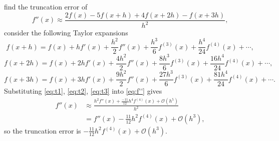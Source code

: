\documentclass[a4paper,11pt]{article}
\begin{document}
\begin{enumerate}
\begin{enumerate}
		find the truncation error of 
		\begin{equation}
			f''(x) \approx \frac{2f(x)-5f(x+h)+4f(x+2h)-f(x+3h)}{h^{2}},
			\label{eq:f''}
		\end{equation}
		consider the following Taylor expansions
		\begin{equation}
			f(x + h) = f(x) + hf'(x) + \frac{h^{2}}{2}f''(x) + 
			\frac{h^{3}}{6}f^{(3)}(x) + \frac{h^{4}}{24}f^{(4)}(x) + \cdots,
			\label{eq:t1}
		\end{equation}
		\begin{equation}
			f(x + 2h) = f(x) + 2hf'(x) + \frac{4h^{2}}{2}f''(x) + 
			\frac{8h^{3}}{6}f^{(3)}(x) + \frac{16h^{4}}{24}f^{(4)}(x) + 
			\cdots,
			\label{eq:t2}
		\end{equation}
		\begin{equation}
			f(x + 3h) = f(x) + 3hf'(x) + \frac{9h^{2}}{2}f''(x) + 
			\frac{27h^{3}}{6}f^{(3)}(x) + \frac{81h^{4}}{24}f^{(4)}(x) + 
			\cdots.
			\label{eq:t3}
		\end{equation}
		Substituting \eqref{eq:t1}, \eqref{eq:t2}, \eqref{eq:t3} into 
		\eqref{eq:f''} gives
		\begin{align}
			f''(x) &\approx \frac{h^{2}f''(x) + 
			\frac{-11}{12}h^{4}f^{(4)}(x) + \mathcal{O}(h^{5})}{h^{2}}\\
			&= f''(x) - \frac{11}{12}h^{2}f^{(4)}(x) + 
			\mathcal{O}(h^{3}),
		\end{align}
		so the truncation error is $-\frac{11}{12}h^{2}f^{(4)}(x) + 
		\mathcal{O}(h^{3})$.
		

\end{enumerate}
\end{enumerate}
\end{document}

